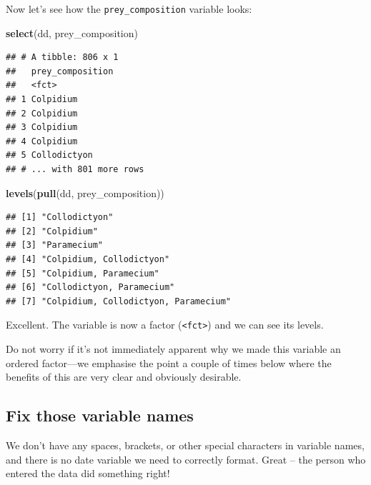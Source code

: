 \documentclass[]{book}
\makeatletter
\newenvironment{Shaded}{\begin{snugshade}}{\end{snugshade}}
\newcommand{\KeywordTok}[1]{\textcolor[rgb]{0.13,0.29,0.53}{\textbf{#1}}}
\newcommand{\NormalTok}[1]{#1}
\newenvironment{kframe}{%
\medskip{}
\setlength{\fboxsep}{.8em}
 \def\at@end@of@kframe{}%
 \ifinner\ifhmode%
  \def\at@end@of@kframe{\end{minipage}}%
  \begin{minipage}{\columnwidth}%
 \fi\fi%
 \def\FrameCommand##1{\hskip\@totalleftmargin \hskip-\fboxsep
 \colorbox{shadecolor}{##1}\hskip-\fboxsep
     \hskip-\linewidth \hskip-\@totalleftmargin \hskip\columnwidth}%
 \MakeFramed {\advance\hsize-\width
   \@totalleftmargin\z@ \linewidth\hsize
   \@setminipage}}%
 {\par\unskip\endMakeFramed%
 \at@end@of@kframe}
\newenvironment{rmdblock}[1]
  {
  \begin{itemize}
  \renewcommand{\labelitemi}{
    \raisebox{-.7\height}[0pt][0pt]{
      {\setkeys{Gin}{width=3em,keepaspectratio}\texttt{[image: images/\#1]}}
    }
  }
  \setlength{\fboxsep}{1em}
  \begin{kframe}
  \item
  }
  {
  \end{kframe}
  \end{itemize}
  }
\newenvironment{info}
  {\begin{rmdblock}{info}}
  {\end{rmdblock}}
\makeatother
\begin{document}
Now let's see how the \texttt{prey\_composition} variable looks:

\begin{Shaded}
\begin{Highlighting}[]
\KeywordTok{select}\NormalTok{(dd, prey_composition)}
\end{Highlighting}
\end{Shaded}

\begin{verbatim}
## # A tibble: 806 x 1
##   prey_composition
##   <fct>           
## 1 Colpidium       
## 2 Colpidium       
## 3 Colpidium       
## 4 Colpidium       
## 5 Collodictyon    
## # ... with 801 more rows
\end{verbatim}

\begin{Shaded}
\begin{Highlighting}[]
\KeywordTok{levels}\NormalTok{(}\KeywordTok{pull}\NormalTok{(dd, prey_composition))}
\end{Highlighting}
\end{Shaded}

\begin{verbatim}
## [1] "Collodictyon"                       
## [2] "Colpidium"                          
## [3] "Paramecium"                         
## [4] "Colpidium, Collodictyon"            
## [5] "Colpidium, Paramecium"              
## [6] "Collodictyon, Paramecium"           
## [7] "Colpidium, Collodictyon, Paramecium"
\end{verbatim}

Excellent. The variable is now a factor (\texttt{\textless{}fct\textgreater{}}) and we can see its levels.

\begin{info}
Do not worry if it's not immediately apparent why we made this variable
an ordered factor---we emphasise the point a couple of times below where
the benefits of this are very clear and obviously desirable.
\end{info}

\hypertarget{fix-those-variable-names}{%
\subsection{Fix those variable names}\label{fix-those-variable-names}}

We don't have any spaces, brackets, or other special characters in variable names, and there is no date variable we need to correctly format. Great -- the person who entered the data did something right!
\end{document}
